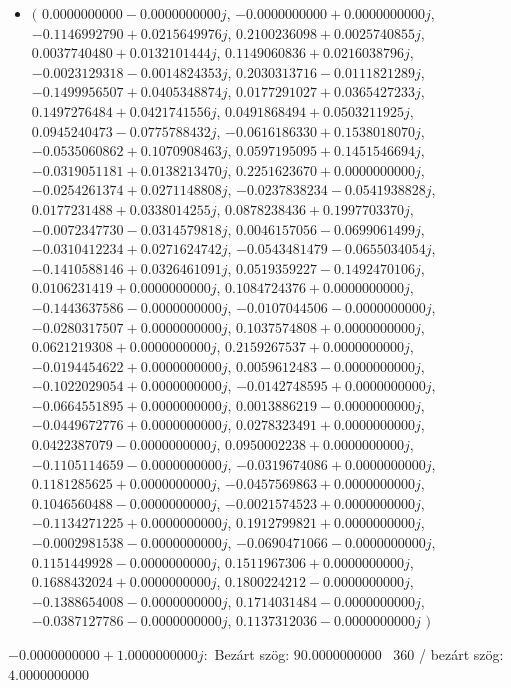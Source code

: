 \documentclass[14pt,a4paper]{article}
\begin{document}
\begin{itemize}
\item
$\big($
$0.0000000000-0.0000000000j$, $-0.0000000000+0.0000000000j$, $-0.1146992790+0.0215649976j$, $0.2100236098+0.0025740855j$, $0.0037740480+0.0132101444j$, $0.1149060836+0.0216038796j$, $-0.0023129318-0.0014824353j$, $0.2030313716-0.0111821289j$, $-0.1499956507+0.0405348874j$, $0.0177291027+0.0365427233j$, $0.1497276484+0.0421741556j$, $0.0491868494+0.0503211925j$, $0.0945240473-0.0775788432j$, $-0.0616186330+0.1538018070j$, $-0.0535060862+0.1070908463j$, $0.0597195095+0.1451546694j$, $-0.0319051181+0.0138213470j$, $0.2251623670+0.0000000000j$, $-0.0254261374+0.0271148808j$, $-0.0237838234-0.0541938828j$, $0.0177231488+0.0338014255j$, $0.0878238436+0.1997703370j$, $-0.0072347730-0.0314579818j$, $0.0046157056-0.0699061499j$, $-0.0310412234+0.0271624742j$, $-0.0543481479-0.0655034054j$, $-0.1410588146+0.0326461091j$, $0.0519359227-0.1492470106j$, $0.0106231419+0.0000000000j$, $0.1084724376+0.0000000000j$, $-0.1443637586-0.0000000000j$, $-0.0107044506-0.0000000000j$, $-0.0280317507+0.0000000000j$, $0.1037574808+0.0000000000j$, $0.0621219308+0.0000000000j$, $0.2159267537+0.0000000000j$, $-0.0194454622+0.0000000000j$, $0.0059612483-0.0000000000j$, $-0.1022029054+0.0000000000j$, $-0.0142748595+0.0000000000j$, $-0.0664551895+0.0000000000j$, $0.0013886219-0.0000000000j$, $-0.0449672776+0.0000000000j$, $0.0278323491+0.0000000000j$, $0.0422387079-0.0000000000j$, $0.0950002238+0.0000000000j$, $-0.1105114659-0.0000000000j$, $-0.0319674086+0.0000000000j$, $0.1181285625+0.0000000000j$, $-0.0457569863+0.0000000000j$, $0.1046560488-0.0000000000j$, $-0.0021574523+0.0000000000j$, $-0.1134271225+0.0000000000j$, $0.1912799821+0.0000000000j$, $-0.0002981538-0.0000000000j$, $-0.0690471066-0.0000000000j$, $0.1151449928-0.0000000000j$, $0.1511967306+0.0000000000j$, $0.1688432024+0.0000000000j$, $0.1800224212-0.0000000000j$, $-0.1388654008-0.0000000000j$, $0.1714031484-0.0000000000j$, $-0.0387127786-0.0000000000j$, $0.1137312036-0.0000000000j$
$\big)$
\end{itemize}
$-0.0000000000+1.0000000000j$:\
Bezárt szög: $90.0000000000$ \
360 / bezárt szög: $4.0000000000$\
\end{document}
